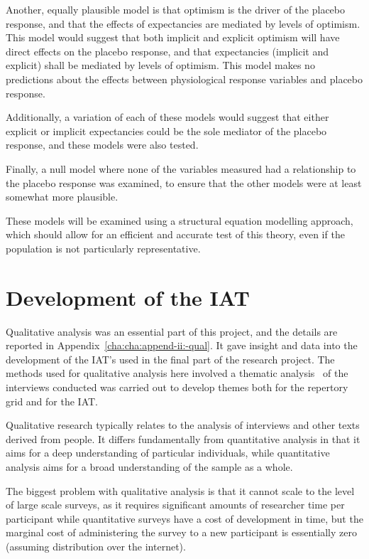 Another, equally plausible model is that optimism is the driver of the placebo response, and that the effects of expectancies are mediated by levels of optimism. This model would suggest that both implicit and explicit optimism will have direct effects on the placebo response, and that expectancies (implicit and explicit) shall be mediated by levels of optimism. This model makes no predictions about the effects between physiological response variables and placebo response. 

Additionally, a variation of each of these models would suggest that either explicit or implicit expectancies could be the sole mediator of the placebo response, and these models were also tested. 

Finally, a null model where none of the variables measured had a relationship to the placebo response was examined, to ensure that the other models were at least somewhat more plausible. 

These models will be examined using a structural equation modelling approach, which should allow for an efficient and accurate test of this theory, even if the population is not particularly representative. 


\section{Development of the IAT}

Qualitative analysis was an essential part of this project, and the details are reported in Appendix~\ref{cha:cha:append-ii:-qual}.   
It gave insight and data into the development of the IAT's used in the final part of the research project.
The methods used for qualitative analysis here involved a thematic analysis~\cite{braun2006using} of the interviews conducted was carried out to develop themes both for the repertory grid and for the IAT.

Qualitative research typically relates to the analysis of interviews and other texts derived from people. It differs fundamentally from quantitative analysis in that it aims for a deep understanding of particular individuals, while quantitative analysis aims for a broad understanding of the sample as a whole. 

The biggest problem with qualitative analysis is that it cannot scale to the level of large scale surveys, as it requires significant amounts of researcher time per participant while quantitative surveys have a cost of development in time, but the marginal cost of administering the survey to a new participant is essentially zero (assuming distribution over the internet).

